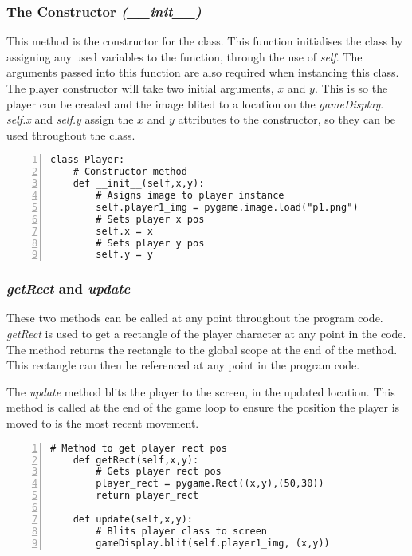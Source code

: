 \documentclass[12pt]{report}
\begin{document}
\normalsize

\subsubsection{The Constructor \textit{(\_\_init\_\_)}}
This method is the constructor for the class. This function initialises the class by assigning any used variables to the function, through the use of \textit{self}. The arguments passed into this function are also required when instancing this class. The player constructor will take two initial arguments, $x$ and $y$. This is so the player can be created and the image blited to a location on the \textit{gameDisplay}. \textit{self.x} and \textit{self.y} assign the $x$ and $y$ attributes to the constructor, so they can be used throughout the class.

\begin{Verbatim}[numbers=left, frame=single]
class Player:
    # Constructor method
    def __init__(self,x,y):
        # Asigns image to player instance
        self.player1_img = pygame.image.load("p1.png")
        # Sets player x pos
        self.x = x
        # Sets player y pos
        self.y = y
\end{Verbatim}

\subsubsection{\textit{getRect} and \textit{update}}
These two methods can be called at any point throughout the program code. \textit{getRect} is used to get a rectangle of the player character at any point in the code. The method returns the rectangle to the global scope at the end of the method. This rectangle can then be referenced at any point in the program code. 

The \textit{update} method blits the player to the screen, in the updated location. This method is called at the end of the game loop to ensure the position the player is moved to is the most recent movement.

\begin{Verbatim}[numbers=left, frame=single]
    # Method to get player rect pos
    def getRect(self,x,y):
        # Gets player rect pos
        player_rect = pygame.Rect((x,y),(50,30))
        return player_rect
        
    def update(self,x,y):
        # Blits player class to screen
        gameDisplay.blit(self.player1_img, (x,y))
\end{Verbatim}
\end{document}
